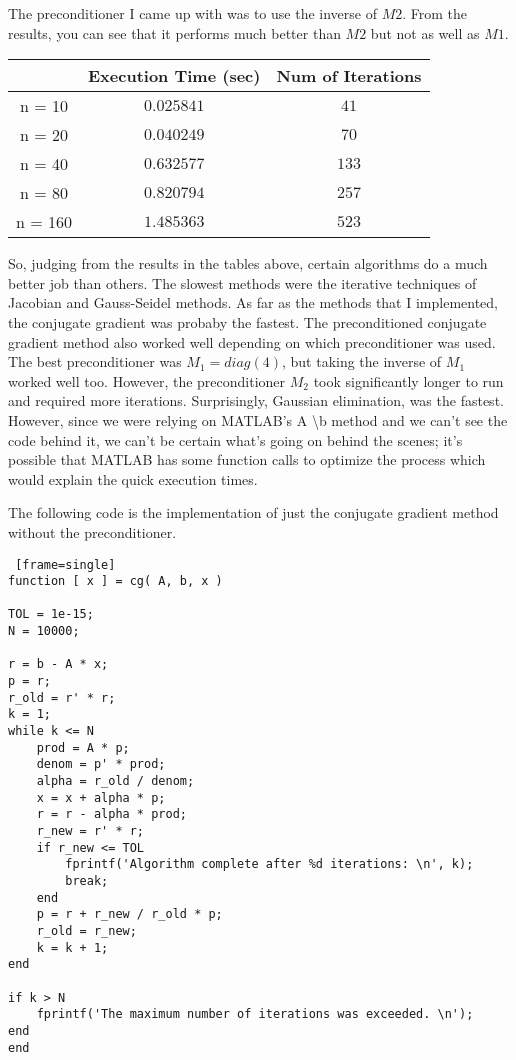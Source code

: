 \documentclass[paper=a4, fontsize=11pt]{scrartcl} %
\numberwithin{equation}{section} %
\numberwithin{figure}{section} %
\numberwithin{table}{section} %
\begin{document}
The preconditioner I came up with was to use the inverse of $M2$.  From the results, you can see that it performs much better than $M2$ but not as well as $M1$.  

\begin{center}
\begin{tabular} {| c | c | c |}
\hline
        & Execution Time (sec) & Num of Iterations\\ \hline
n = 10  & $0.025841$ & $41$ \\ \hline
n = 20  & $0.040249$ & $70$ \\ \hline
n = 40  & $0.632577$ & $133$\\ \hline
n = 80  & $0.820794$ & $257$\\ \hline
n = 160 & $1.485363$ & $523$\\
\hline
\end{tabular}
\end{center}


So, judging from the results in the tables above, certain algorithms do a much better job than others.  The slowest methods were the iterative techniques of Jacobian and Gauss-Seidel methods.  As far as the methods that I implemented, the conjugate gradient was probaby the fastest.  The preconditioned conjugate gradient method also worked well depending on which preconditioner was used.  The best preconditioner was $M_1 = diag(4)$, but taking the inverse of $M_1$ worked well too.  However, the preconditioner $M_2$ took significantly longer to run and required more iterations.  Surprisingly, Gaussian elimination, was the fastest.  However, since we were relying on MATLAB's A \textbackslash b method and we can't see the code behind it, we can't be certain what's going on behind the scenes; it's possible that MATLAB has some function calls to optimize the process which would explain the quick execution times.  

\bigskip
\bigskip
\bigskip


The following code is the implementation of just the conjugate gradient method without the preconditioner.  

\begin{lstlisting} [frame=single]
function [ x ] = cg( A, b, x )

TOL = 1e-15;
N = 10000;

r = b - A * x;
p = r;
r_old = r' * r;
k = 1;
while k <= N
    prod = A * p;
    denom = p' * prod;
    alpha = r_old / denom;
    x = x + alpha * p;
    r = r - alpha * prod;
    r_new = r' * r;
    if r_new <= TOL
        fprintf('Algorithm complete after %d iterations: \n', k);
        break;
    end
    p = r + r_new / r_old * p;
    r_old = r_new;
    k = k + 1;
end

if k > N
    fprintf('The maximum number of iterations was exceeded. \n');
end
end
\end{lstlisting}
\end{document}
